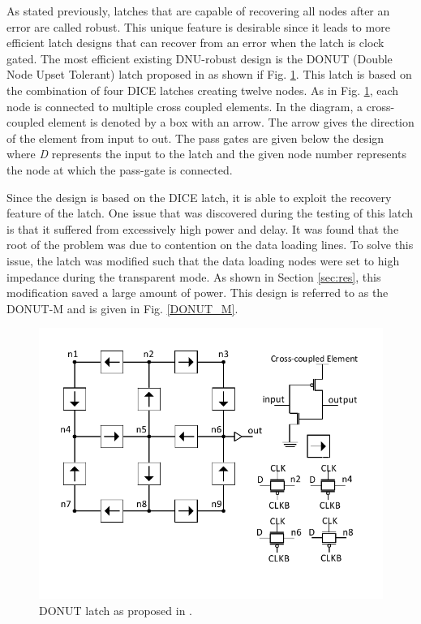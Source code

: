 As stated previously, latches that are capable of recovering all nodes after an error are called robust. This unique feature is desirable since it leads to more efficient latch designs that can recover from an error when the latch is clock gated. The most efficient existing DNU-robust design is the DONUT (Double Node Upset Tolerant) latch proposed in \cite{DONUT} as shown if Fig. \ref{fig:DONUT}. This latch is based on the combination of four DICE latches creating twelve nodes. As in Fig. \ref{fig:DONUT}, each node is connected to multiple cross coupled elements. In the diagram, a cross-coupled element is denoted by a box with an arrow. The arrow gives the direction of the element from input to out. The pass gates are given below the design where \textit{D} represents the input to the latch and the given node number represents the node at which the pass-gate is connected.

Since the design is based on the DICE latch, it is able to exploit the recovery feature of the latch. One issue that was discovered during the testing of this latch is that it suffered from excessively high power and delay. It was found that the root of the problem was due to contention on the data loading lines. To solve this issue, the latch was modified such that the data loading nodes were set to high impedance during the transparent mode. As shown in Section \ref{sec:res}, this modification saved a large amount of power. This design is referred to as the DONUT-M and is given in Fig. \ref{DONUT_M}.

\begin{figure}[!htbp]
	\centering
	\includegraphics[trim = 0mm 12mm 0mm 7mm, clip, width=\linewidth]{Figures/DONUT}
	\caption{DONUT latch as proposed in \cite{DONUT}.}
	\label{fig:DONUT}
\end{figure}


